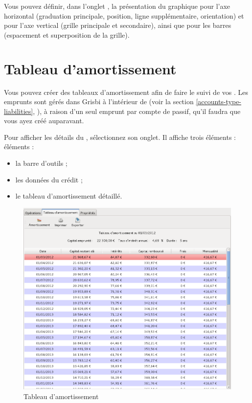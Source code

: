 Vous pouvez définir, dans l'onglet , la présentation du graphique pour l'axe horizontal (graduation principale, position, ligne supplémentaire, orientation) et pour l'axe vertical (grille principale et secondaire), ainsi que pour les barres (espacement et superposition de la grille).


\section{Tableau d'amortissement\label{budget-amortization}}


Vous pouvez créer des tableaux d'amortissement afin de faire le suivi de vos . Les emprunts sont gérés dans Grisbi à l'intérieur de  (voir la section \vref{accounts-type-liabilities}, ), à raison d'un seul emprunt par compte de passif, qu'il faudra que vous ayez créé auparavant. 

Pour afficher les détails du , sélectionnez son onglet. Il affiche trois \ifIllustration éléments : 
\else éléments : 
\fi

\begin{itemize}
	\item la barre d'outils ;
	\item les données du crédit ; 
	\item le tableau d'amortissement détaillé.
\end{itemize} 

\ifIllustration
\begin{figure}[t]
\begin{center}
\includegraphics[scale=0.5]{image/screenshot/budget_amortization}
\end{center}
\caption{Tableau d'amortissement}
\label{budget-amortization-img}
\end{figure}
\fi

